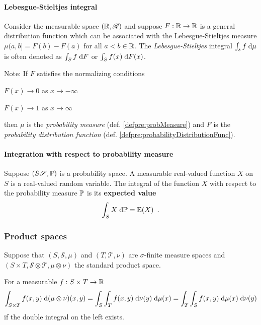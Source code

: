 \paragraph{Lebesgue-Stieltjes integral} Consider the measurable space $(\mathbb{R}, \mathscr{R})$ and suppose $F : \mathbb{R} \to \mathbb{R}$ is a general distribution function which can be associated with the Lebesgue-Stieltjes measure $\mu(a,b] = F(b) - F(a)$ for all $a < b \in \mathbb{R}$.
The \emph{Lebesgue-Stieltjes} integral $\int_s f \; \text{d} \mu$ is often denoted as $\int_S f \; \text{d} F$ or $\int_S f(x) \; \text{d} F(x)$.

Note: If $F$ satisfies the normalizing conditions
\begin{compactitem}
\item $F(x) \to 0$ as $x \to -\infty$
\item $F(x) \to 1$ as $x \to \infty$
\end{compactitem}
then $\mu$ is the \emph{probability measure} (def. \ref{defpre:probMeasure}) and $F$ is the \emph{probability distribution function} (def. \ref{defpre:probabilityDistributionFunc}).

\paragraph{Integration with respect to probability measure} Suppose $(S \mathscr{S}, \mathbb{P})$ is a probability space. A measurable real-valued function $X$ on $S$ is a real-valued random variable. The integral of the function $X$ with respect to the probability measure $\mathbb{P}$ is its \textbf{expected value}
\begin{equation}
\int_S X \; \text{d} \mathbb{P} = \mathbb{E} (X) \enspace .
\end{equation}

\subsubsection{Product spaces}

Suppose that $(S, \mathscr{S}, \mu)$ and $(T, \mathscr{T}, \nu)$ are $\sigma$-finite measure spaces and $(S \times T, \mathscr{S \otimes T}, \mu \otimes \nu)$ the standard product space.

\begin{theorem}[Fubini's]
For a measurable $f : S \times T \to \mathbb{R}$
\begin{equation}
\int_{S \times T} f(x,y) \; \text{d}(\mu \otimes \nu)(x, y) = \int_S \int_T f(x,y) \; \text{d} \nu(y) \; \text{d} \mu(x) = \int_T \int_S f(x,y) \; \text{d} \mu(x) \; \text{d} \nu(y)
\end{equation}
 if the double integral on the left exists.
\end{theorem}

